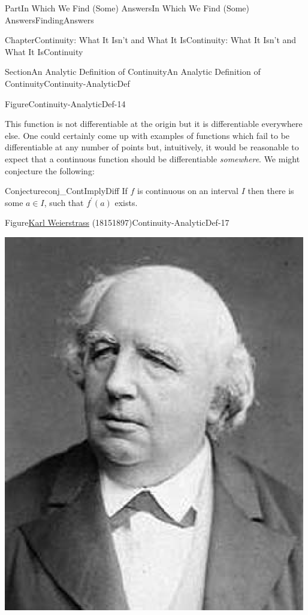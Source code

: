 \documentclass[oneside,10pt,]{book}
\numberwithin{equation}{part}
\begin{document}
\begin{partptx}{Part}{In Which We Find (Some) Answers}{}{In Which We Find (Some) Answers}{}{}{FindingAnswers}
\begin{chapterptx}{Chapter}{Continuity: What It Isn't and What It Is}{}{Continuity: What It Isn't and What It Is}{}{}{Continuity}
\begin{sectionptx}{Section}{An Analytic Definition of Continuity}{}{An Analytic Definition of Continuity}{}{}{Continuity-AnalyticDef}
\begin{figureptx}{Figure}{}{Continuity-AnalyticDef-14}{}
\begin{image}{0.125}{0.75}{0.125}{}
\end{image}%
\tcblower
\end{figureptx}%
This function is not differentiable at the origin but it is differentiable everywhere else.  One could certainly come up with examples of functions which fail to be differentiable at any number of points but, intuitively, it would be reasonable to expect that a continuous function should be differentiable \emph{somewhere}.  We might conjecture the following:%
\begin{conjecture}{Conjecture}{}{}{conj_ContImplyDiff}%
If \(f\) is continuous on an interval \(I\) then there is some \(a\in I\), such that \(f^\prime(a)\) exists.%
\end{conjecture}
\begin{figureptx}{Figure}{\href{https://mathshistory.st-andrews.ac.uk/Biographies/Weierstrass/}{Karl Weierstrass}\protect\footnotemark{} (1815\textendash{}1897)}{Continuity-AnalyticDef-17}{}%
%
\begin{image}{0.325}{0.35}{0.325}{}%
\includegraphics[width=\linewidth]{external/images/Weierstrass.png}

\end{image}
\end{figureptx}
\end{sectionptx}
\end{chapterptx}
\end{partptx}
\end{document}
